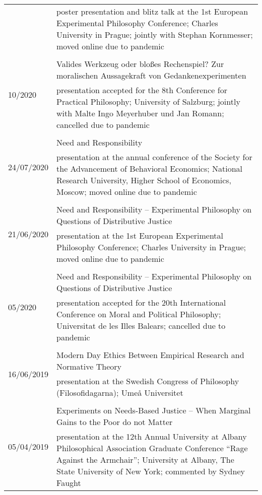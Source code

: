 \documentclass[a4paper,10pt]{article}
\begin{document}
\begin{longtable}{p{2.25cm}p{11cm}}
& \footnotesize{poster presentation and blitz talk at the 1st European Experimental Philosophy Conference; Charles University in Prague; jointly with Stephan Kornmesser; moved online due to pandemic}\\
\\
\multirow{2}{2.25cm}{\footnotesize{10/2020}} & Valides Werkzeug oder bloßes Rechenspiel? Zur moralischen Aussagekraft von Gedankenexperimenten\\
& \footnotesize{presentation accepted for the 8th Conference for Practical Philosophy; University of Salzburg; jointly with Malte Ingo Meyerhuber und Jan Romann; cancelled due to pandemic}\\
\\
\multirow{2}{2.25cm}{\footnotesize{24/07/2020}} & Need and Responsibility\\
& \footnotesize{presentation at the annual conference of the Society for the Advancement of Behavioral Economics; National Research University, Higher School of Economics, Moscow; moved online due to pandemic}\\
\\
\multirow{2}{2.25cm}{\footnotesize{21/06/2020}} & Need and Responsibility -- Experimental Philosophy on Questions of Distributive Justice\\
& \footnotesize{presentation at the 1st European Experimental Philosophy Conference; Charles University in Prague; moved online due to pandemic}\\
\\
\multirow{2}{2.25cm}{\footnotesize{05/2020}} & Need and Responsibility -- Experimental Philosophy on Questions of Distributive Justice\\
& \footnotesize{presentation accepted for the 20th International Conference on Moral and Political Philosophy; Universitat de les Illes Balears; cancelled due to pandemic}\\
\\
\multirow{2}{2.25cm}{\footnotesize{16/06/2019}} & Modern Day Ethics Between Empirical Research and Normative Theory\\
& \footnotesize{presentation at the Swedish Congress of Philosophy (Filosofidagarna); Umeå Universitet}\\
\\
\multirow{2}{2.25cm}{\footnotesize{05/04/2019}} & Experiments on Needs-Based Justice -- When Marginal Gains to the Poor do not Matter\\
& \footnotesize{presentation at the 12th Annual University at Albany Philosophical Association Graduate Conference \enquote{Rage Against the Armchair}; University at Albany, The State University of New York; commented by Sydney Faught}\\

\end{longtable}
\end{document}
